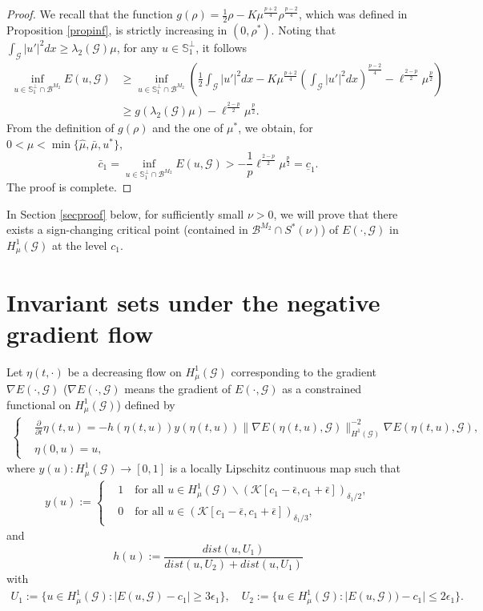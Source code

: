 \documentclass[10pt,a4paper]{article}
\theoremstyle{definition} \theoremstyle{remark}
\numberwithin{equation}{section}
\newcommand{\G}{\mathcal{G}}
\newcommand{\B}{\mathcal{B}}
\newcommand{\s}{\mathbb{S}}
\newcommand{\la}{\lambda}
\begin{document}
\begin{proof}
We recall that the function $g(\rho) = \frac12\rho - K\mu^{\frac{p+2}4} \rho^{\frac{p-2}4}$, which was defined in Proposition \ref{propinf}, is strictly increasing in $(0,\rho^*)$. Noting that $\int_\G|u'|^2dx \geq \la_2(\G)\mu$, for any $u \in \s_1^\perp$, it follows
\begin{align*} 
		\inf_{u\in\s_1^\perp \cap \B^{M_2}}E(u,\G)
		& \geq \inf_{u\in\s_1^\perp \cap \B^{M_2}}\left( \frac12\int_\G|u'|^2dx - K\mu^{\frac{p+2}4}\left( \int_\G|u'|^2dx\right)^{\frac{p-2}4} - \ell^{\frac{2-p}2}\mu^\frac p2 \right) \nonumber \\
		& \geq g(\la_2(\G)\mu)- \ell^{\frac{2-p}2}\mu^\frac p2.
	\end{align*}
	From the definition of $g(\rho)$ and the one of $\mu^*$, we obtain, for $0 < \mu < \min\{\hat{\mu},\bar{\mu}, u^*\}$,  
    $$
    \bar{c}_1 = \inf_{u\in\s_1^\perp \cap \B^{M_2}}E(u,\G) > -\frac1p\ell^{\frac{2-p}2}\mu^{\frac p2} = \underline{c}_1.
    $$
    The proof is complete.
\end{proof}

 
In Section \ref{secproof} below, for sufficiently small $\nu > 0$, we will prove that there exists a sign-changing critical point (contained in $\B^{M_2} \cap S^*(\nu)$) of $E(\cdot,\G)$ in $H^1_\mu(\G)$ at the level $c_1$. 

\section{Invariant sets under the negative gradient flow} \label{secinv}

Let $\eta(t,\cdot)$ be a decreasing flow on $H^1_\mu(\G)$ corresponding to the gradient $\nabla E(\cdot,\G)$ ($\nabla E(\cdot, \G)$ means the gradient of $E(\cdot, \G)$ as a constrained functional on $H^1_\mu(\G)$) defined by
\begin{align} \label{eqflow}
	\left\{
	\begin{aligned}
		& \frac{\partial}{\partial t}\eta(t,u) = -h(\eta(t,u))y(\eta(t,u))\|\nabla E(\eta(t,u),\G)\|_{H^1(\G)}^{-2}\nabla E(\eta(t,u),\G), \\
		& \eta(0,u) = u,
	\end{aligned}
	\right.
\end{align}
where $y(u): H^1_\mu(\G) \to [0,1]$ is a locally Lipschitz continuous map such that
\begin{align*}
	y(u) :=
	\left\{
	\begin{aligned}
		& 1 \quad \text{for all } u \in H^1_\mu(\G) \backslash(\mathcal{K}[c_1-\bar{\epsilon},c_1+\bar{\epsilon}])_{\delta_1/2}, \\
		& 0 \quad \text{for all } u \in (\mathcal{K}[c_1-\bar{\epsilon},c_1+\bar{\epsilon}])_{\delta_1/3},
	\end{aligned}
	\right.
\end{align*}
and $$h(u):= \frac{dist(u,U_1)}{dist(u,U_2)+dist(u,U_1)}$$ with
\begin{align*}
	U_1 := \bigl\{u \in H^1_\mu(\G): |E(u,\G) - c_1| \geq 3 \epsilon_1\bigr\}, \quad U_2 := \bigl\{u \in H^1_\mu(\G): |E(u,\G)) - c_1| \leq 2 \epsilon_1\bigr\}. 
\end{align*}
\end{document}
